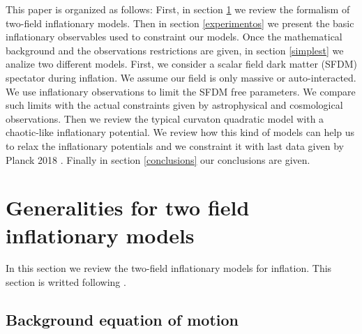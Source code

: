 \documentclass[amssymb,twocolumn,prd,nofootinbib,showpacs]{revtex4-1}
\begin{document}
This paper is organized as follows: First, in section \ref{Generalities} we review the formalism of two-field inflationary models. Then in section \ref{experimentos} we present the basic inflationary observables used to constraint our models. Once the mathematical background and the observations restrictions are given, in section \ref{simplest} we analize two different models. First, we consider a scalar field dark matter (SFDM) spectator during inflation. We assume our field is only massive or auto-interacted. We use inflationary observations to limit the SFDM free parameters. We compare such limits with the actual constraints given by astrophysical and cosmological observations. Then we review the typical curvaton quadratic model with a chaotic-like inflationary potential. We review how this kind of models can help us to relax the inflationary potentials and we constraint it with last data given by Planck 2018 \cite{planck}. Finally in section \ref{conclusions} our conclusions are given.      

\section{Generalities for two field inflationary models}\label{Generalities}

In this section we review the two-field inflationary models for inflation. This section is writted following \cite{twofields}. 

\subsection{Background equation of motion}
\end{document}
